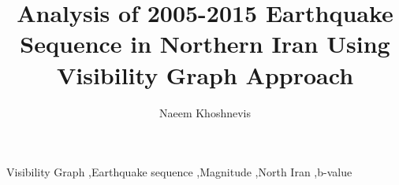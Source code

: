 \documentclass[authoryear,preprint,review,12pt]{elsarticle}
\begin{document}
\begin{frontmatter}

\title{Analysis of 2005-2015 Earthquake Sequence in Northern Iran Using Visibility Graph Approach}

\author[label1]{Naeem Khoshnevis}




\begin{keyword}
Visibility Graph \sep Earthquake sequence \sep Magnitude \sep North Iran \sep b-value 



\end{keyword}

\end{frontmatter}















\end{document}
